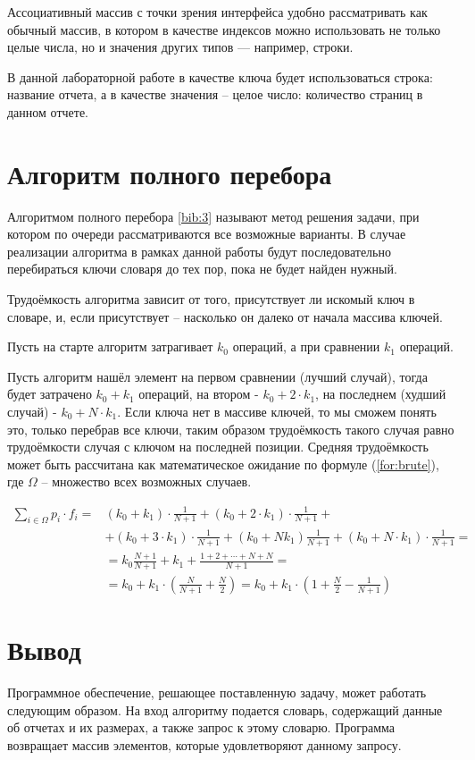 Ассоциативный массив с точки зрения интерфейса удобно рассматривать как обычный массив, в котором в качестве индексов можно использовать не только целые числа, но и значения других типов — например, строки.

В данной лабораторной работе в качестве ключа будет использоваться строка: название отчета, а в качестве значения -- целое число: количество страниц в данном отчете.

\section{Алгоритм полного перебора}
Алгоритмом полного перебора \ref{bib:3} называют метод решения задачи, при котором по очереди рассматриваются все возможные варианты. В случае реализации алгоритма в рамках данной работы будут последовательно перебираться ключи словаря до тех пор, пока не будет найден нужный. 

Трудоёмкость алгоритма зависит от того, присутствует ли искомый ключ в словаре, и, если присутствует -- насколько он далеко от начала массива ключей.

Пусть на старте алгоритм затрагивает $k_{0}$ операций, а при сравнении $k_{1}$ операций. 

Пусть алгоритм нашёл элемент на первом сравнении (лучший случай), тогда будет затрачено $k_0 + k_1$ операций, на втором - $k_0 + 2 \cdot k_1$, на последнем (худший случай) - $k_0 + N \cdot k_1$. Если ключа нет в массиве ключей, то мы сможем понять это, только перебрав все ключи, таким образом трудоёмкость такого случая равно трудоёмкости случая с ключом на последней позиции. Средняя трудоёмкость может быть рассчитана как математическое ожидание по формуле (\ref{for:brute}), где $\Omega$ -- множество всех возможных случаев.

\begin{equation}
\label{for:brute}
\begin{aligned}
\sum\limits_{i \in \Omega} p_i \cdot f_i = & (k_0 + k_1) \cdot \frac{1}{N + 1} + (k_0 + 2 \cdot k_1) \cdot \frac{1}{N+1} +\\& + (k_0 + 3 \cdot k_1) \cdot \frac{1}{N + 1} + (k_0 + Nk_1)\frac{1}{N + 1} + (k_0 + N \cdot k_1) \cdot \frac{1}{N + 1} =\\& = k_0\frac{N+1}{N+1}+k_1+\frac{1 + 2 + \cdots + N + N}{N + 1} = \\& = k_0 + k_1 \cdot \left(\frac{N}{N + 1} + \frac{N}{2}\right) = k_0 + k_1 \cdot \left(1 + \frac{N}{2} - \frac{1}{N + 1}\right)
\end{aligned}
\end{equation}


	\section*{Вывод}
\par Программное обеспечение, решающее поставленную задачу, может работать следующим образом. На вход алгоритму подается словарь, содержащий данные об отчетах и их размерах, а также запрос к этому словарю. Программа возвращает массив элементов, которые удовлетворяют данному запросу. 


\newpage